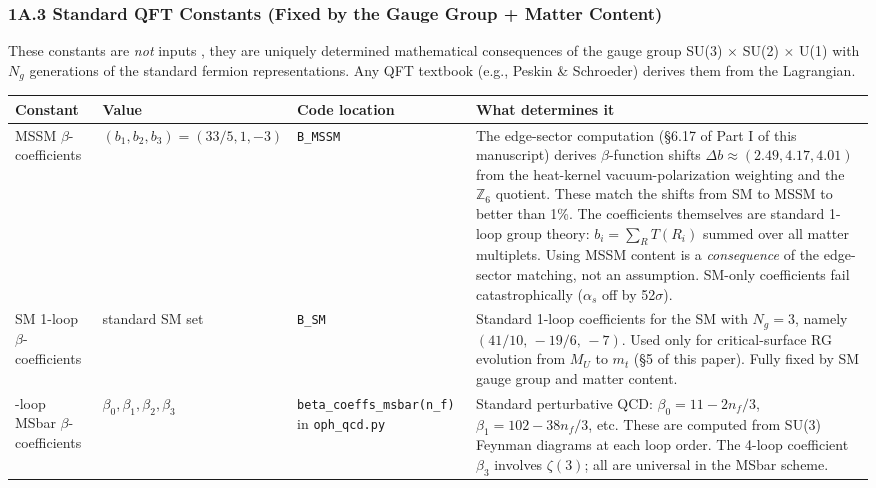 \subsubsection{1A.3 Standard QFT Constants (Fixed by the Gauge Group + Matter Content)}\label{1a3-standard-qft-constants-fixed-by-the-gauge-group--matter-content}

These constants are \emph{not} inputs , they are uniquely determined mathematical consequences of the gauge group SU(3) \(\times\) SU(2) \(\times\) U(1) with \(N_g\) generations of the standard fermion representations. Any QFT textbook (e.g., Peskin \& Schroeder) derives them from the Lagrangian.

{\def\LTcaptype{none} %
\setlength{\LTleft}{0pt}
\setlength{\LTright}{0pt}
\setlength{\tabcolsep}{1.2pt}
\renewcommand{\arraystretch}{1.05}
\footnotesize
\begin{longtable}[]{@{}>{\RaggedRight\arraybackslash}p{}>{\RaggedRight\arraybackslash}p{}>{\RaggedRight\arraybackslash}p{}>{\RaggedRight\arraybackslash}p{}@{}}
\toprule\noalign{}
Constant & Value & Code location & What determines it \\
\midrule\noalign{}
\endhead
\bottomrule\noalign{}
\endlastfoot
MSSM \(\beta\)-coefficients & \((b_1, b_2, b_3) = (33/5, 1, -3)\) & \texttt{B\_MSSM} & The edge-sector computation (§6.17 of Part I of this manuscript) derives \(\beta\)-function shifts \(\Delta b \approx (2.49, 4.17, 4.01)\) from the heat-kernel vacuum-polarization weighting and the \(\mathbb{Z}_6\) quotient. These match the shifts from SM to MSSM to better than 1\%. The coefficients themselves are standard 1-loop group theory: \(b_i = \sum_R T(R_i)\) summed over all matter multiplets. Using MSSM content is a \emph{consequence} of the edge-sector matching, not an assumption. SM-only coefficients fail catastrophically (\(\alpha_s\) off by 52\(\sigma\)). \\
SM 1-loop \(\beta\)-coefficients & standard SM set & \texttt{B\_SM} & Standard 1-loop coefficients for the SM with \(N_g = 3\), namely \((41/10,\,-19/6,\,-7)\). Used only for critical-surface RG evolution from \(M_U\) to \(m_t\) (§5 of this paper). Fully fixed by SM gauge group and matter content. \\
4-loop MSbar \(\beta\)-coefficients & \(\beta_0, \beta_1, \beta_2, \beta_3\) & \texttt{beta\_\allowbreak coeffs\_\allowbreak msbar(n\_\allowbreak f)} in \texttt{oph\_\allowbreak qcd.py} & Standard perturbative QCD: \(\beta_0 = 11 - 2n_f/3\), \(\beta_1 = 102 - 38n_f/3\), etc. These are computed from SU(3) Feynman diagrams at each loop order. The 4-loop coefficient \(\beta_3\) involves \(\zeta(3)\); all are universal in the MSbar scheme. \\

\end{longtable}}
